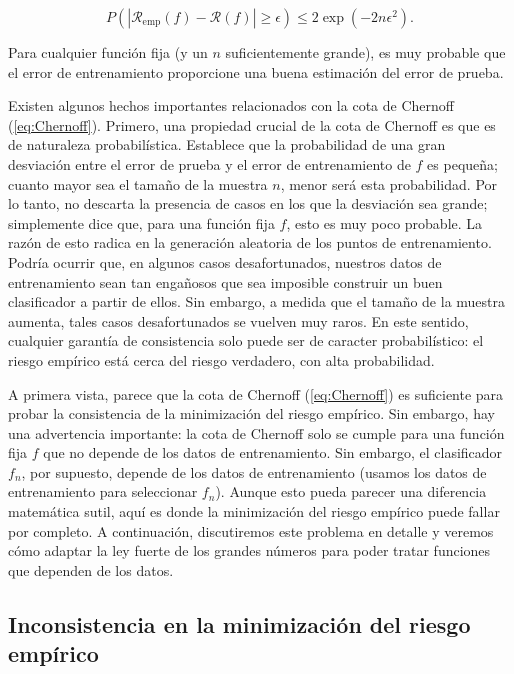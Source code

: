\documentclass{report}
\begin{document}
\begin{equation}
P(|\mathcal{R}_{\text{emp}}(f) - \mathcal{R}(f)| \geq \epsilon) \leq 2 \exp(-2n\epsilon^2).  \label{eq:Chernoff}
\end{equation}

Para cualquier función fija (y un \(n\) suficientemente grande), es muy probable que el error de entrenamiento 
proporcione una buena estimación del error de prueba.\newline

Existen algunos hechos importantes relacionados con la cota de Chernoff (\ref{eq:Chernoff}). Primero, una propiedad crucial 
de la cota de Chernoff es que es de naturaleza probabilística. Establece que la probabilidad de una gran desviación 
entre el error de prueba y el error de entrenamiento de \(f\) es pequeña; cuanto mayor sea el tamaño de la muestra 
\(n\), menor será esta probabilidad. Por lo tanto, no descarta la presencia de casos en los que la desviación sea 
grande; simplemente dice que, para una función fija \(f\), esto es muy poco probable. La razón de esto radica en la 
generación aleatoria de los puntos de entrenamiento. Podría ocurrir que, en algunos casos desafortunados, nuestros 
datos de entrenamiento sean tan engañosos que sea imposible construir un buen clasificador a partir de ellos. Sin 
embargo, a medida que el tamaño de la muestra aumenta, tales casos desafortunados se vuelven muy raros. En este 
sentido, cualquier garantía de consistencia solo puede ser de caracter probabilístico: el riesgo empírico está cerca del riesgo 
verdadero, con alta probabilidad.\newline

A primera vista, parece que la cota de Chernoff (\ref{eq:Chernoff}) es suficiente para probar la consistencia de la minimización 
del riesgo empírico. Sin embargo, hay una advertencia importante: la cota de Chernoff solo se cumple para una función 
fija \(f\) que no depende de los datos de entrenamiento. Sin embargo, el clasificador \(f_n\), por supuesto, depende 
de los datos de entrenamiento (usamos los datos de entrenamiento para seleccionar \(f_n\)). Aunque esto pueda parecer 
una diferencia matemática sutil, aquí es donde la minimización del riesgo empírico puede fallar por completo. A 
continuación, discutiremos este problema en detalle y veremos cómo adaptar la ley fuerte de los grandes números para 
poder tratar funciones que dependen de los datos.\newline

\subsection{Inconsistencia en la minimización del riesgo empírico} \label{Inconsistencia en la minimización del riesgo empírico}
\end{document}
